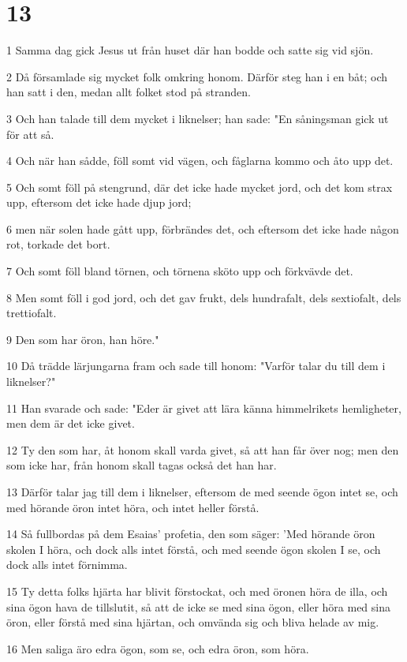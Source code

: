 \chapter{13}

\par 1 Samma dag gick Jesus ut från huset där han bodde och satte sig vid sjön.
\par 2 Då församlade sig mycket folk omkring honom. Därför steg han i en båt; och han satt i den, medan allt folket stod på stranden.
\par 3 Och han talade till dem mycket i liknelser; han sade: "En såningsman gick ut för att så.
\par 4 Och när han sådde, föll somt vid vägen, och fåglarna kommo och åto upp det.
\par 5 Och somt föll på stengrund, där det icke hade mycket jord, och det kom strax upp, eftersom det icke hade djup jord;
\par 6 men när solen hade gått upp, förbrändes det, och eftersom det icke hade någon rot, torkade det bort.
\par 7 Och somt föll bland törnen, och törnena sköto upp och förkvävde det.
\par 8 Men somt föll i god jord, och det gav frukt, dels hundrafalt, dels sextiofalt, dels trettiofalt.
\par 9 Den som har öron, han höre."
\par 10 Då trädde lärjungarna fram och sade till honom: "Varför talar du till dem i liknelser?"
\par 11 Han svarade och sade: "Eder är givet att lära känna himmelrikets hemligheter, men dem är det icke givet.
\par 12 Ty den som har, åt honom skall varda givet, så att han får över nog; men den som icke har, från honom skall tagas också det han har.
\par 13 Därför talar jag till dem i liknelser, eftersom de med seende ögon intet se, och med hörande öron intet höra, och intet heller förstå.
\par 14 Så fullbordas på dem Esaias' profetia, den som säger: 'Med hörande öron skolen I höra, och dock alls intet förstå, och med seende ögon skolen I se, och dock alls intet förnimma.
\par 15 Ty detta folks hjärta har blivit förstockat, och med öronen höra de illa, och sina ögon hava de tillslutit, så att de icke se med sina ögon, eller höra med sina öron, eller förstå med sina hjärtan, och omvända sig och bliva helade av mig.
\par 16 Men saliga äro edra ögon, som se, och edra öron, som höra.
